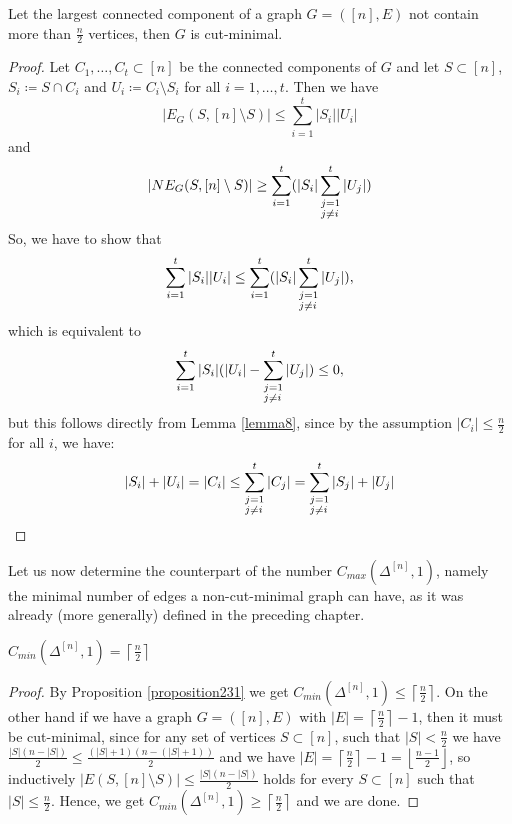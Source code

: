 \begin{prop}
Let the largest connected component of a graph \(G=([n],E)\) not contain more than \(\frac{n}{2}\) vertices, then \(G\) is cut-minimal.
\begin{proof}
Let \(C_1,\ldots,C_t\subset [n]\) be the connected components of \(G\) and let \(S\subset [n]\), \(S_i\coloneqq S\cap C_i\) and \(U_i\coloneqq C_i\setminus S_i\) for all \(i=1,\ldots,t\). Then we have
\[
|E_G(S,[n]\setminus S)|\leq\sum\limits_{i=1}^t|S_i||U_i|
\] 
and
\[
|NE_G(S,[n]\setminus S)|\geq\sum\limits_{i=1}^t(|S_i|\sum_{\begin{subarray}{l}j=1\\ j\neq i\end{subarray}}^t|U_j|)
\]
So, we have to show that
\[
\sum\limits_{i=1}^t|S_i||U_i|\leq\sum\limits_{i=1}^t(|S_i|\sum_{\begin{subarray}{l}j=1\\ j\neq i\end{subarray}}^t|U_j|),
\]
which is equivalent to
\[
\sum\limits_{i=1}^t|S_i|(|U_i|-\sum_{\begin{subarray}{l}j=1\\ j\neq i\end{subarray}}^t|U_j|)\leq 0,
\]
but this follows directly from Lemma \ref{lemma8}, since by the assumption \(|C_i|\leq\frac{n}{2}\) for all \(i\), we have:
\[
|S_i|+|U_i|=|C_i|\leq\sum_{\begin{subarray}{l}j=1\\ j\neq i\end{subarray}}^t|C_j|=\sum_{\begin{subarray}{l}j=1\\ j\neq i\end{subarray}}^t|S_j|+|U_j|
\]
\end{proof}
\end{prop}

Let us now determine the counterpart of the number \(C_{max}(\Delta^{[n]},1)\), namely the minimal number of edges a non-cut-minimal graph can have, as it was already (more generally) defined in the preceding chapter.

\begin{thm}\label{theorem2}
\(C_{min}(\Delta^{[n]},1)=\left\lceil\frac{n}{2}\right\rceil\)
\begin{proof}
By Proposition \ref{proposition231} we get \(C_{min}(\Delta^{[n]},1)\leq\left\lceil\frac{n}{2}\right\rceil\). On the other hand if we have a graph \(G=([n],E)\) with \(|E|=\left\lceil\frac{n}{2}\right\rceil-1\), then it must be cut-minimal, since for any set of vertices \(S\subset[n]\), such that \(|S|<\frac{n}{2}\) we have \(\frac{|S|(n-|S|)}{2}\leq\frac{(|S|+1)(n-(|S|+1))}{2}\) and we have \(|E|=\left\lceil\frac{n}{2}\right\rceil-1=\left\lfloor\frac{n-1}{2}\right\rfloor\), so inductively \(|E(S,[n]\setminus S)|\leq\frac{|S|(n-|S|)}{2}\) holds for every \(S\subset [n]\) such that \(|S|\leq\frac{n}{2}\). Hence, we get \(C_{min}(\Delta^{[n]},1)\geq\left\lceil\frac{n}{2}\right\rceil\) and we are done.
\end{proof}
\end{thm}

